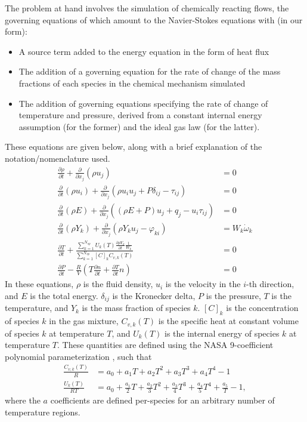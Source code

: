 The problem at hand involves the simulation of chemically reacting flows, the
governing equations of which amount to the Navier-Stokes equations with (in
our form):
\begin{itemize}
\item{A source term added to the energy equation in the form of heat flux}
\item{The addition of a governing equation for the rate of change of the
      mass fractions of each species in the chemical mechanism simulated}
\item{The addition of governing equations specifying the rate of change of
      temperature and pressure, derived from a constant internal energy
      assumption (for the former) and the ideal gas law (for the latter).}
\end{itemize}
These equations are given below, along with a brief explanation of the notation/nomenclature
used.
\begin{align}
\frac{\partial \rho}{\partial t} + \frac{\partial}{\partial x_{j}}(\rho u_{j}) &= 0 \\
\frac{\partial}{\partial t}(\rho u_{i}) + \frac{\partial}{\partial x_{j}}(\rho u_{i} u_{j} + P\delta_{ij} - \tau_{ij}) &= 0 \\
\frac{\partial}{\partial t}(\rho E) + \frac{\partial}{\partial x_{j}}((\rho E + P)u_{j} + q_{j} - u_{i}\tau_{ij}) &= 0 \\
\frac{\partial}{\partial t}(\rho Y_{k}) + \frac{\partial}{\partial x_{j}}(\rho Y_{k} u_{j} - \varphi_{ki}) &= W_{k}\dot{\omega}_{k} \\
\frac{\partial T}{\partial t} + \frac{\sum_{k=1}^{N_{sp}}U_{k}(T)\frac{\partial \rho Y_{k}}{\partial t}\frac{1}{W_{k}}}{\sum_{k=1}^{N_{sp}}[C]_{k}C_{v,k}(T)} &= 0 \\
\frac{\partial P}{\partial t} - \frac{R}{V}(T\frac{\partial n}{\partial t} + \frac{\partial T}{\partial t}n) &= 0
\end{align}
In these equations, $\rho$ is the fluid density, $u_{i}$ is the velocity in the $i$-th direction, and $E$ is the total energy.
$\delta_{ij}$ is the Kronecker delta, $P$ is the pressure, $T$ is the temperature, and $Y_{k}$ is the mass fraction of
species $k$. $[C]_{k}$ is the concentration of species $k$ in the gas mixture, $C_{v,k}(T)$ is the specific heat at constant volume
of species $k$ at temperature $T$, and $U_{k}(T)$ is the internal energy of species $k$ at temperature $T$. These quantities
are defined using the NASA 9-coefficient polynomial parameterization \cite{mcbride2002nasa}, such that
\begin{align}
\frac{C_{v,k}(T)}{R} &= a_{0} + a_{1}T + a_{2}T^{2} + a_{3}T^{3} + a_{4}T^{4} - 1 \\
\frac{U_{k}(T)}{RT} &= a_{0} + \frac{a_{1}}{2}T + \frac{a_{2}}{3}T^{2} + \frac{a_{3}}{4}T^{3} + \frac{a_{4}}{5}T^{4} + \frac{a_{5}}{T} - 1,
\end{align}
where the $a$ coefficients are defined per-species for an arbitrary number of temperature regions.


